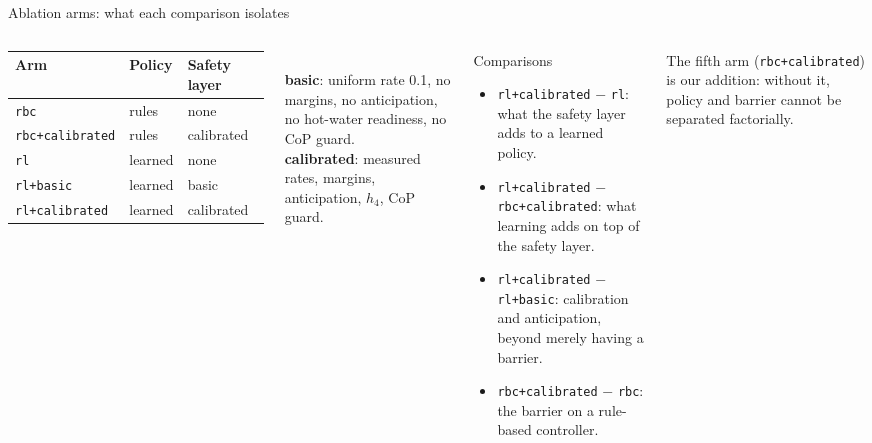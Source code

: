 \documentclass[aspectratio=169,10pt]{beamer}
\begin{document}
\begin{frame}{Ablation arms: what each comparison isolates}
\begin{columns}[T]
\small
\begin{tabular}{@{}lll@{}}
\toprule
Arm & Policy & Safety layer \\
\midrule
\texttt{rbc} & rules & none \\
\texttt{rbc+calibrated} & rules & calibrated \\
\texttt{rl} & learned & none \\
\texttt{rl+basic} & learned & basic \\
\texttt{rl+calibrated} & learned & calibrated \\
\bottomrule
\end{tabular}\\[6pt]
\textbf{basic}: uniform rate 0.1, no margins, no anticipation, no hot-water readiness, no CoP guard.\\
\textbf{calibrated}: measured rates, margins, anticipation, $h_4$, CoP guard.
\begin{block}{Comparisons}
\begin{itemize}
  \item \texttt{rl+calibrated} $-$ \texttt{rl}: what the safety layer adds to a learned policy.
  \item \texttt{rl+calibrated} $-$ \texttt{rbc+calibrated}: what learning adds on top of the safety layer.
  \item \texttt{rl+calibrated} $-$ \texttt{rl+basic}: calibration and anticipation, beyond merely having a barrier.
  \item \texttt{rbc+calibrated} $-$ \texttt{rbc}: the barrier on a rule-based controller.
\end{itemize}
\end{block}
\small The fifth arm (\texttt{rbc+calibrated}) is our addition: without it, policy and barrier cannot be separated factorially.
\end{columns}
\end{frame}
\end{document}
